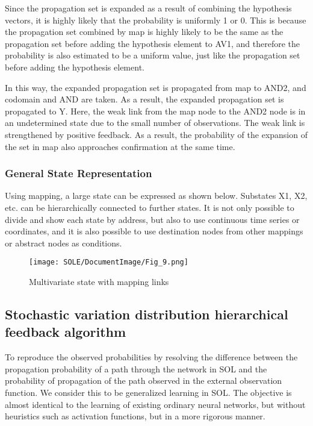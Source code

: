 \documentclass[12pt]{article}
\begin{document}
Since the propagation set is expanded as a result of combining the
hypothesis vectors, it is highly likely that the probability is
uniformly 1 or 0. This is because the propagation set combined by map is
highly likely to be the same as the propagation set before adding the
hypothesis element to AV1, and therefore the probability is also
estimated to be a uniform value, just like the propagation set before
adding the hypothesis element.

In this way, the expanded propagation set is propagated from map to
AND2, and codomain and AND are taken. As a result, the expanded
propagation set is propagated to Y. Here, the weak link from the map
node to the AND2 node is in an undetermined state due to the small
number of observations. The weak link is strengthened by positive
feedback. As a result, the probability of the expansion of the set in
map also approaches confirmation at the same time.

\subsubsection{General State Representation}\label{general-state-representation}

Using mapping, a large state can be expressed as shown below. Substates
X1, X2, etc. can be hierarchically connected to further states. It is
not only possible to divide and show each state by address, but also to
use continuous time series or coordinates, and it is also possible to
use destination nodes from other mappings or abstract nodes as
conditions.

\begin{figure}[ht]
  \centering
  \texttt{[image: SOLE/DocumentImage/Fig\_9.png]}
  \caption{Multivariate state with mapping links}
  \label{fig:multivariate_state_with_mapping_links}
\end{figure}

\subsection{Stochastic variation distribution hierarchical feedback
algorithm}\label{stochastic-variation-distribution-hierarchical-feedback-algorithm}

To reproduce the observed probabilities by resolving the difference
between the propagation probability of a path through the network in SOL
and the probability of propagation of the path observed in the external
observation function. We consider this to be generalized learning in
SOL. The objective is almost identical to the learning of existing
ordinary neural networks, but without heuristics such as activation
functions, but in a more rigorous manner.
\end{document}
